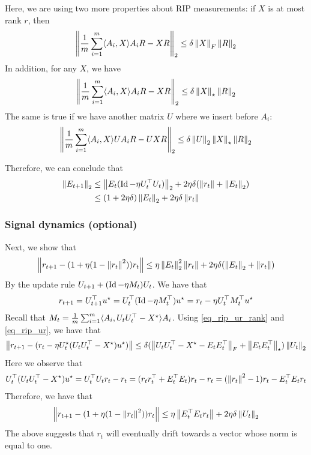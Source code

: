 Here, we are using two more properties about RIP measurements:
if $X$ is at most rank $r$, then
\begin{align} \left\| \frac 1 m \sum_{i=1}^m \langle A_i, X \rangle A_i R - XR \right\|_{2} \le \delta \left\| X \right\|_{F} \left\| R \right\|_{2} \label{eq_rip_ur_rank}\end{align}
In addition, for any $X$, we have
\begin{align} \left\| \frac 1 m \sum_{i=1}^m \langle A_i, X \rangle A_i R - XR \right\|_{2} \le \delta \left\| X \right\|_{\star} \left\| R \right\|_{2} \end{align}
The same is true if we have another matrix $U$ where we insert before $A_i$:
\begin{align} \label{eq_rip_ur}
    \left\| \frac 1 m \sum_{i=1}^m \langle A_i, X \rangle U A_i R - U X R \right\|_{2}
    \le \delta \left\| U \right\|_{2} \left\| X \right\|_{\star} \left\| R \right\|_{2}
\end{align}

Therefore, we can conclude that
\begin{align*}
    \left\| E_{t+1} \right\|_{2} &\le \left\| E_t (\operatorname{Id} - \eta U_t^{\top} U_t) \right\|_{2} + 2 \eta \delta(\left\| r_t \right\| + \left\| E_t \right\|_{2}) \\
    &\le (1 + 2\eta\delta) \left\| E_t \right\|_{2} + 2\eta\delta \left\| r_t \right\|
\end{align*}

\subsubsection{Signal dynamics (optional)}

Next, we show that
\begin{align}
    \left\| r_{t+1} - (1 + \eta(1 - \left\| r_t \right\|^2)) r_t  \right\|
    \le \eta \left\| E_t \right\|_{2}^2 \left\| r_t \right\| + 2\eta \delta (\left\| E_t \right\|_{2} + \left\| r_t \right\|)
\end{align}
By the update rule $U_{t+1} + (\operatorname{Id} - \eta M_t) U_t$.
We have that
\begin{align*}
    r_{t+1} = U_{t+1}^{\top} u^{\star}
    = U_t^{\top} (\operatorname{Id} - \eta M_t^{\top}) u^{\star}
    = r_t - \eta U_t^{\top} M_t^{\top} u^{\star}
\end{align*}
Recall that $M_t = \frac 1 m \sum_{i=1}^m \langle A_i, U_t U_t^{\top} - X^{\star} \rangle A_i$.
Using \eqref{eq_rip_ur_rank} and \eqref{eq_rip_ur}, we have that
\begin{align}
    \left\| r_{t+1} - (r_t - \eta U_t^{\star} (U_t U_t^{\top} - X^{\star}) u^{\star}) \right\|
    \le \delta (\left\| U_t U_t^{\top} - X^{\star} - E_t E_t^{\top} \right\|_{F} + \left\| E_t E_t^{\top} \right\|_{\star}) \left\| U_t \right\|_{2}
\end{align}
Here we observe that
\begin{align}
    U_t^{\top} (U_t U_t^{\top} - X^{\star}) u^{\star}
    = U_t^{\top} U_t r_t - r_t
    = (r_t r_t^{\top} + E_t^{\top} E_t) r_t - r_t
    = (\left\| r_t \right\|^2 - 1) r_t - E_t^{\top} E_t r_t
\end{align}
Therefore, we have that
\begin{align}
    \left\| r_{t+1} - (1 + \eta(1 - \left\| r_t \right\|^2)) r_t \right\|
    \le \eta \left\| E_t^{\top} E_t r_t \right\| + 2 \eta\delta \left\| U_t \right\|_{2}
\end{align}
The above suggests that $r_t$ will eventually drift towards a vector whose norm is equal to one.

